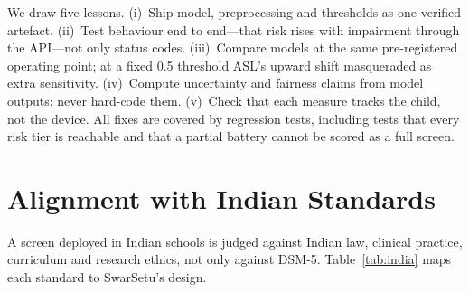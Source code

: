 \documentclass[conference]{IEEEtran}
\begin{document}
We draw five lessons. (i)~Ship model, preprocessing and thresholds as one verified artefact. (ii)~Test behaviour end to end---that risk rises with impairment through the API---not only status codes. (iii)~Compare models at the same pre-registered operating point; at a fixed 0.5 threshold ASL's upward shift masqueraded as extra sensitivity. (iv)~Compute uncertainty and fairness claims from model outputs; never hard-code them. (v)~Check that each measure tracks the child, not the device. All fixes are covered by regression tests, including tests that every risk tier is reachable and that a partial battery cannot be scored as a full screen.

\section{Alignment with Indian Standards}\label{sec:india}
A screen deployed in Indian schools is judged against Indian law, clinical practice, curriculum and research ethics, not only against DSM-5. Table~\ref{tab:india} maps each standard to SwarSetu's design.
\end{document}
